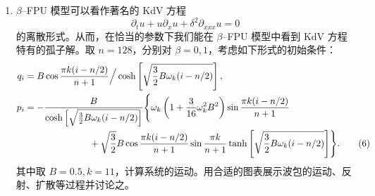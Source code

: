 \begin{enumerate}[label=\arabic*.]
\item $\beta$--FPU 模型可以看作著名的 KdV 方程
\begin{equation}
\partial_tu+u\partial_xu+\delta^2\partial_{xxx}u=0
\tag{5}
\end{equation}
的离散形式。从而，在恰当的参数下我们能在 $\beta$--FPU 模型中看到 KdV 方程特有的孤子解。取 $n=128$，分别对 $\beta=0,1$，考虑如下形式的初始条件：
\begin{align}
q_i&=B\cos\frac{\pi k(i-n/2)}{n+1}\Big/\cosh\left[\sqrt{\frac32B\omega_k(i-n/2)}\right],\notag\\
p_i&=-\frac{B}{\cosh\left[\sqrt{\frac32B\omega_k(i-n/2)}\right]}
\Biggl\{\omega_k\left(1+\frac3{16}\omega_k^2B^2\right)\sin\frac{\pi k(i-n/2)}{n+1}\notag\\
&\qquad\qquad\qquad\quad+\sqrt{\frac32}B\cos\frac{\pi k(i-n/2)}{n+1}\sin\frac{\pi k}{n+1}
\tanh\left[\sqrt{\frac32B\omega_k(i-n/2)}\right]\Biggr\}.
\tag{6}
\end{align}
其中取 $B=0.5,k=11$，计算系统的运动。用合适的图表展示波包的运动、反射、扩散等过程并讨论之。
\end{enumerate}

